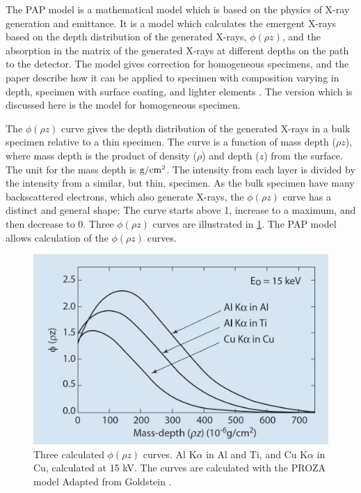 The PAP model is a mathematical model which is based on the physics of X-ray generation and emittance.
It is a model which calculates the emergent X-rays based on the depth distribution of the generated X-rays, $\phi(\rho z)$, and the absorption in the matrix of the generated X-rays at different depths on the path to the detector.
The model gives correction for homogeneous specimens, and the paper describe how it can be applied to specimen with composition varying in depth, specimen with surface coating, and lighter elements \cite{pap_1991}.
The version which is discussed here is the model for homogeneous specimen.



The $\phi(\rho z)$ curve gives the depth distribution of the generated X-rays in a bulk specimen relative to a thin specimen.
The curve is a function of mass depth ($\rho z$), where mass depth is the product of density ($\rho$) and depth ($z$) from the surface. 
The unit for the mass depth is $\textnormal{g}/\textnormal{cm}^2$.
The intensity from each layer is divided by the intensity from a similar, but thin, specimen.
As the bulk specimen have many backscattered electrons, which also generate X-rays, the $\phi(\rho z)$ curve has a distinct and general shape:
The curve starts above 1, increase to a maximum, and then decrease to 0.
Three $\phi(\rho z)$ curves are illustrated in \cref{fig:theory:quantification:phi_rho_z_curves}.
The PAP model allows calculation of the $\phi(\rho z)$ curves.




\begin{figure}[htbp]
    \centering
    \includegraphics[width=0.65\linewidth]{figures/phi_rho_z_curves__goldstein.png}
    \caption{
        Three calculated $\phi(\rho z)$ curves.
        Al K$\alpha$ in Al and Ti, and Cu K$\alpha$ in Cu, calculated at 15 kV.
        The curves are calculated with the PROZA model \cite{bastin_proza_1988}
        Adapted from Goldstein \cite[Fig. 19.9]{goldstein_scanning_2018}.
    }
    \label{fig:theory:quantification:phi_rho_z_curves}
\end{figure}


